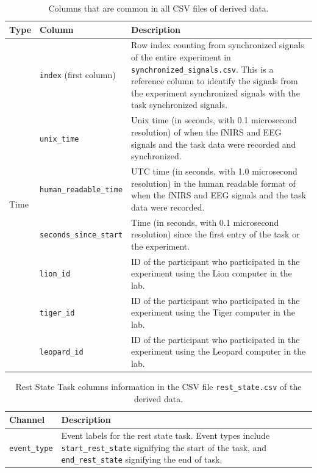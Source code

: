 \begin{table}[h]
\centering
\begin{tabularx}{\textwidth}{|l|l|X|}
\hline
\textbf{Type} & \textbf{Column} & \textbf{Description} \\
\hline
\multirow{13}{*}{\parbox{2cm}{Time}}
& \texttt{index} (first column) & Row index counting from synchronized signals of the entire experiment in \texttt{synchronized\_signals.csv}. This is a reference column to identify the signals from the experiment synchronized signals with the task synchronized signals.\\
& \texttt{unix\_time} & Unix time (in seconds, with 0.1 microsecond resolution) of when the fNIRS and EEG signals and the task data were recorded and synchronized.\\
& \texttt{human\_readable\_time} & UTC time (in seconds, with 1.0 microsecond resolution) in the human readable format of when the fNIRS and EEG signals and the task data were recorded.\\
& \texttt{seconds\_since\_start} & Time (in seconds, with 0.1 microsecond resolution) since the first entry of the task or the experiment.\\
\hline
\multirow{6}{*}{\parbox{2cm}{Subject ID}}
& \texttt{lion\_id} & ID of the participant who participated in the experiment using the Lion computer in the lab.\\
& \texttt{tiger\_id} & ID of the participant who participated in the experiment using the Tiger computer in the lab.\\
& \texttt{leopard\_id} & ID of the participant who participated in the experiment using the Leopard computer in the lab.\\
\hline
\end{tabularx}
\caption{Columns that are common in all CSV files of derived data.}
\label{tab:shared_columns}
\end{table}

\begin{table}[h]
\centering
\begin{tabularx}{\textwidth}{|l|X|}
\hline
\textbf{Channel} & \textbf{Description} \\
\hline
\texttt{event\_type} & Event labels for the rest state task. Event types include \texttt{start\_rest\_state} signifying the start of the task, and \texttt{end\_rest\_state} signifying the end of task.\\
\hline
\end{tabularx}
\caption{Rest State Task columns information in the CSV file \texttt{rest\_state.csv} of the derived data.}
\label{tab:rest_task_columns}
\end{table}

